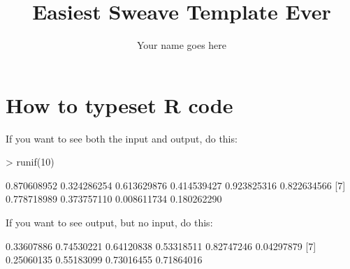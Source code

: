 \documentclass[12pt]{article}         %
\title{Easiest Sweave Template Ever}  %
\author{Your name goes here}          %
\begin{document}




\maketitle              %

\section{How to typeset \textsf{R} code}

If you want to see both the input and output, do this:

\begin{Schunk}
\begin{Sinput}
> runif(10)
\end{Sinput}
\begin{Soutput}
 [1] 0.870608952 0.324286254 0.613629876 0.414539427 0.923825316 0.822634566
 [7] 0.778718989 0.373757110 0.008611734 0.180262290
\end{Soutput}
\end{Schunk}

If you want to see output, but no input, do this:

\begin{Schunk}
\begin{Soutput}
 [1] 0.33607886 0.74530221 0.64120838 0.53318511 0.82747246 0.04297879
 [7] 0.25060135 0.55183099 0.73016455 0.71864016
\end{Soutput}
\end{Schunk}
\end{document}
